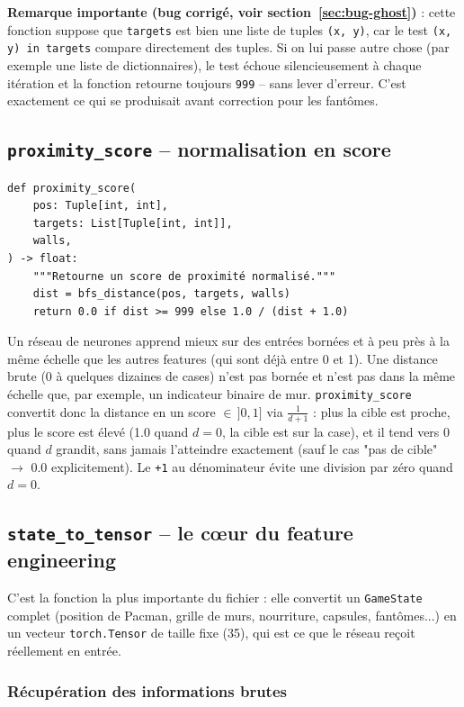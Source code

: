 \documentclass[a4paper,12pt]{article}
\begin{document}
\textbf{Remarque importante (bug corrigé, voir
section~\ref{sec:bug-ghost})} : cette fonction suppose que \texttt{targets}
est bien une liste de tuples \texttt{(x, y)}, car le test
\texttt{(x, y) in targets} compare directement des tuples. Si on lui
passe autre chose (par exemple une liste de dictionnaires), le test
échoue silencieusement à chaque itération et la fonction retourne
toujours \texttt{999} -- sans lever d'erreur. C'est exactement ce qui
se produisait avant correction pour les fantômes.

\subsection{\texttt{proximity\_score} -- normalisation en score}

\begin{lstlisting}
def proximity_score(
    pos: Tuple[int, int],
    targets: List[Tuple[int, int]],
    walls,
) -> float:
    """Retourne un score de proximité normalisé."""
    dist = bfs_distance(pos, targets, walls)
    return 0.0 if dist >= 999 else 1.0 / (dist + 1.0)
\end{lstlisting}

Un réseau de neurones apprend mieux sur des entrées bornées et à peu près
à la même échelle que les autres features (qui sont déjà entre 0 et 1).
Une distance brute (0 à quelques dizaines de cases) n'est pas bornée et
n'est pas dans la même échelle que, par exemple, un indicateur binaire de
mur. \texttt{proximity\_score} convertit donc la distance en un score
$\in \,]0, 1]$ via $\frac{1}{d+1}$ : plus la cible est proche, plus le
score est élevé (1.0 quand $d=0$, la cible est sur la case), et il tend
vers 0 quand $d$ grandit, sans jamais l'atteindre exactement (sauf le cas
"pas de cible" $\to$ 0.0 explicitement). Le \texttt{+1} au dénominateur
évite une division par zéro quand $d=0$.

\subsection{\texttt{state\_to\_tensor} -- le c\oe{}ur du feature engineering}

C'est la fonction la plus importante du fichier : elle convertit un
\texttt{GameState} complet (position de Pacman, grille de murs, nourriture,
capsules, fantômes...) en un vecteur \texttt{torch.Tensor} de taille fixe
(35), qui est ce que le réseau reçoit réellement en entrée.

\subsubsection{Récupération des informations brutes}
\end{document}

